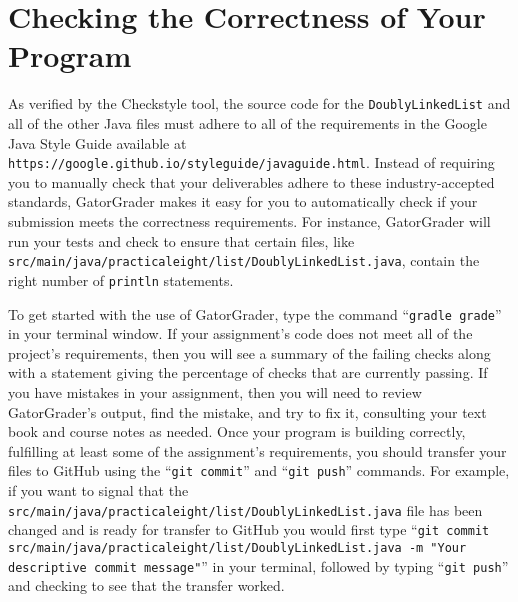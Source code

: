 \documentclass[11pt]{article}
\newcommand{\mainprogram}{\lstinline{DoublyLinkedList}}
\newcommand{\mainprogramsource}{\lstinline{src/main/java/practicaleight/list/DoublyLinkedList.java}}
\newcommand{\gatorgraderstart}{\command{gradle grade}}
\newcommand{\gradlebuild}{\command{gradle build}}
\newcommand{\gitcommit}{\command{git commit}}
\newcommand{\gitpush}{\command{git push}}
\newcommand{\gitcommitmainprogram}{\command{git commit src/main/java/practicaleight/list/DoublyLinkedList.java -m "Your
descriptive commit message"}}
\newcommand{\command}[1]{``\lstinline{#1}''}
\newcommand{\program}[1]{\lstinline{#1}}
\newcommand{\url}[1]{\lstinline{#1}}
\newcommand{\step}[1]{``{#1}''}
\begin{document}

\section*{Checking the Correctness of Your Program}

As verified by the Checkstyle tool, the source code for the \mainprogram{} and
all of the other Java files must adhere to all of the requirements in the Google
Java Style Guide available at
\url{https://google.github.io/styleguide/javaguide.html}. Instead of requiring
you to manually check that your deliverables adhere to these industry-accepted
standards, GatorGrader makes it easy for you to automatically check if your
submission meets the correctness requirements. For instance, GatorGrader will
run your tests and check to ensure that certain files, like
\mainprogramsource{}, contain the right number of \program{println} statements.

To get started with the use of GatorGrader, type the command
\gatorgraderstart{} in your terminal window. If your assignment's code does not
meet all of the project's requirements, then you will see a summary of the
failing checks along with a statement giving the percentage of checks that are
currently passing. If you have mistakes in your assignment, then you will need
to review GatorGrader's output, find the mistake, and try to fix it, consulting
your text book and course notes as needed. Once your program is building
correctly, fulfilling at least some of the assignment's requirements, you
should transfer your files to GitHub using the \gitcommit{} and \gitpush{}
commands. For example, if you want to signal that the \mainprogramsource{} file
has been changed and is ready for transfer to GitHub you would first type
\gitcommitmainprogram{} in your terminal, followed by typing \gitpush{} and
checking to see that the transfer worked.
\end{document}
